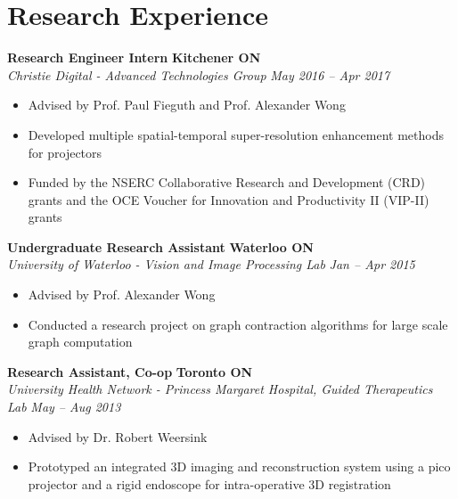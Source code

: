 \section*{Research Experience}
    \vspace{\postsubhead}
      \textbf{Research Engineer Intern}
      \hfill
      \textbf{Kitchener ON}\\
      \textit{Christie Digital - Advanced Technologies Group}
      \hfill
      \textit{May 2016 -- Apr 2017}
      \begin{itemize}
        \item Advised by Prof. Paul Fieguth and Prof. Alexander Wong
        \item Developed multiple spatial-temporal super-resolution enhancement methods for projectors
        \item Funded by the NSERC Collaborative Research and Development (CRD) grants and the OCE Voucher for Innovation and Productivity II (VIP-II) grants
      \end{itemize}
      \vspace{\interlist}
      \textbf{Undergraduate Research Assistant}
      \hfill
      \textbf{Waterloo ON}\\
      \textit{University of Waterloo - Vision and Image Processing Lab}
      \hfill
      \textit{Jan -- Apr 2015}
      \begin{itemize}
        \item Advised by Prof. Alexander Wong
        \item Conducted a research project on graph contraction algorithms for large scale graph computation
      \end{itemize}
      \vspace{\interlist}
      \textbf{Research Assistant, Co-op}
      \hfill
      \textbf{Toronto ON}\\
      \textit{University Health Network - Princess Margaret Hospital, Guided Therapeutics Lab}
      \hfill
      \textit{May -- Aug 2013}
      \begin{itemize}
        \item Advised by Dr. Robert Weersink
        \item Prototyped an integrated 3D imaging and reconstruction system using a pico projector and a rigid endoscope for intra-operative 3D registration
      \end{itemize}
      \vspace{\interlist}
